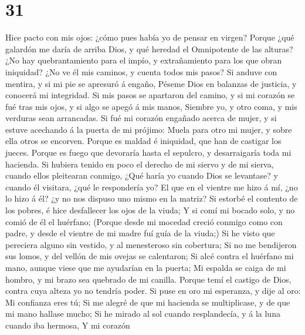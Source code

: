\hypertarget{section-30}{%
\section{31}\label{section-30}}

 Hice pacto con mis ojos: ¿cómo pues había yo de pensar en
virgen?  Porque ¿qué galardón me daría de arriba Dios, y qué
heredad el Omnipotente de las alturas?  ¿No hay
quebrantamiento para el impío, y extrañamiento para los que obran
iniquidad?  ¿No ve él mis caminos, y cuenta todos mis pasos?
 Si anduve con mentira, y si mi pie se apresuró á engaño,
 Péseme Dios en balanzas de justicia, y conocerá mi
integridad.  Si mis pasos se apartaron del camino, y si mi
corazón se fué tras mis ojos, y si algo se apegó á mis manos,
 Siembre yo, y otro coma, y mis verduras sean arrancadas.
 Si fué mi corazón engañado acerca de mujer, y si estuve
acechando á la puerta de mi prójimo:  Muela para otro mi
mujer, y sobre ella otros se encorven.  Porque es maldad é
iniquidad, que han de castigar los jueces.  Porque es fuego
que devoraría hasta el sepulcro, y desarraigaría toda mi hacienda.
 Si hubiera tenido en poco el derecho de mi siervo y de mi
sierva, cuando ellos pleitearan conmigo,  ¿Qué haría yo
cuando Dios se levantase? y cuando él visitara, ¿qué le respondería yo?
 El que en el vientre me hizo á mí, ¿no lo hizo á él? ¿y no
nos dispuso uno mismo en la matriz?  Si estorbé el contento
de los pobres, é hice desfallecer los ojos de la viuda;  Y
si comí mi bocado solo, y no comió de él el huérfano; 
(Porque desde mi mocedad creció conmigo como con padre, y desde el
vientre de mi madre fuí guía de la viuda;)  Si he visto que
pereciera alguno sin vestido, y al menesteroso sin cobertura;
 Si no me bendijeron sus lomos, y del vellón de mis ovejas
se calentaron;  Si alcé contra el huérfano mi mano, aunque
viese que me ayudarían en la puerta;  Mi espalda se caiga
de mi hombro, y mi brazo sea quebrado de mi canilla. 
Porque temí el castigo de Dios, contra cuya alteza yo no tendría poder.
 Si puse en oro mi esperanza, y dije al oro: Mi confianza
eres tú;  Si me alegré de que mi hacienda se multiplicase,
y de que mi mano hallase mucho;  Si he mirado al sol cuando
resplandecía, y á la luna cuando iba hermosa,  Y mi corazón
